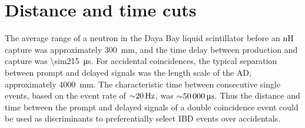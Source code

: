 \section{Distance and time cuts}
\label{sec:DT_cut}

The average range of a neutron
in the Daya Bay liquid scintillator
before an nH capture
was approximately \SI{300}{\milli\meter},
and the time delay between production and capture was \SI{\sim215}{\us}.
For accidental coincidences, the typical separation between prompt and delayed signals was
the length scale of the AD, approximately \SI{4000}{\milli\meter}.
The characteristic time between consecutive single events,
based on the  event rate of $\SI{\sim20}{\Hz}$,
was $\SI{\sim50000}{\us}$.
Thus the distance and time between the prompt and delayed signals
of a double coincidence event could be used
as discriminants to preferentially select IBD events over accidentals.



